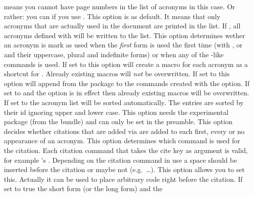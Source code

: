\documentclass[load-preamble+]{cnltx-doc}
\begin{document}
\begin{options}
    means you cannot have page numbers in the list of acronyms in this case.
    Or rather: you can if you use .
    This option is  as default.  It means that only acronyms that
    are actually used in the document are printed in the list.  If
    , all acronyms defined with  will be
    written to the list.
    This option determines wether an acronym is mark as used when the
    \emph{first} form is used the first time (with ,  or
     and their uppercase, plural and indefinite forms) or when any
    of the -like commands is used.   
    If set to  this option will create a macro  for
    each acronym as a shortcut for .  Already existing macros
    will \emph{not} be overwritten.
    If set to  this option will append
     from the  package to the commands created with
    the  option.
    If set to  and the option  is in effect
    then already existing macros will be overwritten.
    If set to  the acronym list will be sorted automatically.  The
    entries are sorted by their \acs{id} ignoring upper and lower case.  This
    option needs the experimental package  (from the
     bundle) and can only be set in the preamble.
    This option decides whether citations that are added via  are
    added to each first, every or no appearance of an acronym.
    This option determines which command is used for the citation.  Each
    citation command that takes the cite key as argument is valid, for example
    's .
    Depending on the citation command in use a space should be inserted before
    the citation or maybe not (e.g.\ \ldots).  This option
    allows you to set this.  Actually it can be used to place arbitrary code
    right before the citation.
    If set to true the short form (or the long form) and the

\end{options}
\end{document}
